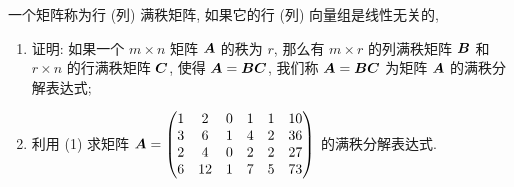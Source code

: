 \begin{example}
    一个矩阵称为行 (列) 满秩矩阵, 如果它的行 (列) 向量组是线性无关的, 
    \begin{enumerate}[label=(\arabic{*})]
        \item 证明: 如果一个 $m\times n$ 矩阵 $\vb*{A}$ 的秩为 $r$, 那么有 $m\times r$ 的列满秩矩阵 $\vb*{B}$ 和 $r\times n$ 的行满秩矩阵 $\vb*{C}$, 使得 $\vb*{A}=\vb*{BC}$, 我们称 $\vb*{A}=\vb*{BC}$ 为矩阵 $\vb*{A}$ 的满秩分解表达式;
        \item 利用 (1) 求矩阵 $\vb*{A}=\mqty(1&2&0&1&1&10\\3&6&1&4&2&36\\2&4&0&2&2&27\\6&12&1&7&5&73)$ 的满秩分解表达式.
    \end{enumerate}
\end{example}
